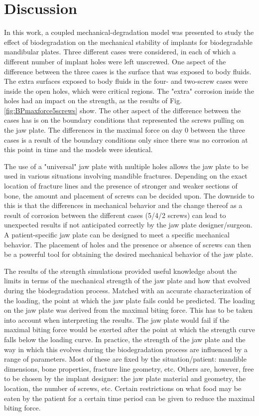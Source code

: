\section{Discussion}

In this work, a coupled mechanical-degradation model was presented to study the effect of biodegradation on the mechanical stability of implants for biodegradable mandibular plates. Three different cases were considered, in each of which a different number of implant holes were left unscrewed. One aspect of the difference between the three cases is the surface that was exposed to body fluids. The extra surfaces exposed to body fluids in the four- and two-screw cases were inside the open holes, which were critical regions. The "extra" corrosion inside the holes had an impact on the strength, as the results of Fig. \ref{fig:BPmaxforce5screws} show. The other aspect of the difference between the cases has is on the boundary conditions that represented the screws pulling on the jaw plate. The differences in the maximal force on day 0 between the three cases is a result of the boundary conditions only since there was no corrosion at this point in time and the models were identical. 

The use of a "universal" jaw plate with multiple holes allows the jaw plate to be used in various situations involving mandible fractures. Depending on the exact location of fracture lines and the presence of stronger and weaker sections of bone, the amount and placement of screws can be decided upon. The downside to this is that the differences in mechanical behavior and the change thereof as a result of corrosion between the different cases (5/4/2 screws) can lead to unexpected results if not anticipated correctly by the jaw plate designer/surgeon. A patient-specific jaw plate can be designed to meet a specific mechanical behavior. The placement of holes and the presence or absence of screws can then be a powerful tool for obtaining the desired mechanical behavior of the jaw plate.

The results of the strength simulations provided useful knowledge about the limits in terms of the mechanical strength of the jaw plate and how that evolved during the biodegradation process. Matched with an accurate characterization of the loading, the point at which the jaw plate fails could be predicted. The loading on the jaw plate was derived from the maximal biting force. This has to be taken into account when interpreting the results. The jaw plate would fail if the maximal biting force would be exerted after the point at which the strength curve falls below the loading curve. In practice, the strength of the jaw plate and the way in which this evolves during the biodegradation process are influenced by a range of parameters. Most of these are fixed by the situation/patient: mandible dimensions, bone properties, fracture line geometry, etc. Others are, however, free to be chosen by the implant designer: the jaw plate material and geometry, the location, the number of screws, etc. Certain restrictions on what food may be eaten by the patient for a certain time period can be given to reduce the maximal biting force. 

